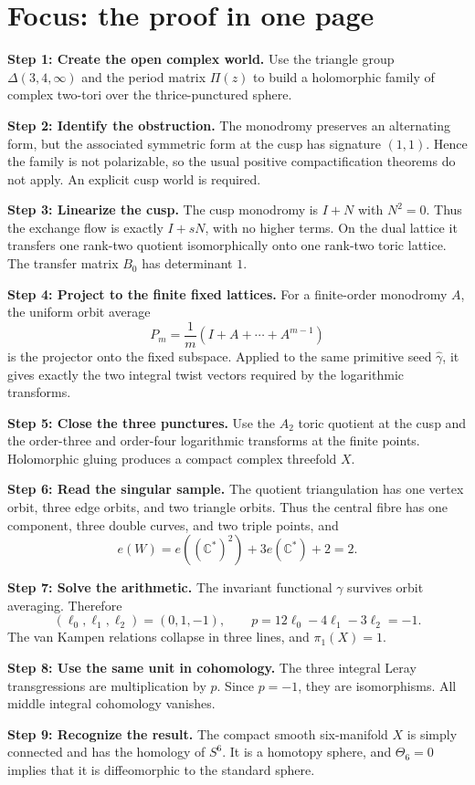\documentclass[11pt,reqno]{amsart}
\numberwithin{equation}{section}
\newcommand{\C}{\mathbb C}
\newcommand{\wideg}{\widehat\gamma}
\theoremstyle{definition}
\newenvironment{proofbox}{%
  \begin{center}\begin{minipage}{0.94\textwidth}\setlength{\parindent}{0pt}\small%
}{%
  \end{minipage}\end{center}%
}
\begin{document}
\section{Focus: the proof in one page}\label{sec:focus}

\begin{proofbox}
\textbf{Step 1: Create the open complex world.}
Use the triangle group $\Delta(3,4,\infty)$ and the period matrix $\Pi(z)$ to build a holomorphic family of complex two-tori over the thrice-punctured sphere.

\medskip
\textbf{Step 2: Identify the obstruction.}
The monodromy preserves an alternating form, but the associated symmetric form at the cusp has signature $(1,1)$. Hence the family is not polarizable, so the usual positive compactification theorems do not apply. An explicit cusp world is required.

\medskip
\textbf{Step 3: Linearize the cusp.}
The cusp monodromy is $I+N$ with $N^2=0$. Thus the exchange flow is exactly $I+sN$, with no higher terms. On the dual lattice it transfers one rank-two quotient isomorphically onto one rank-two toric lattice. The transfer matrix $B_0$ has determinant $1$.

\medskip
\textbf{Step 4: Project to the finite fixed lattices.}
For a finite-order monodromy $A$, the uniform orbit average
\[
P_m=\frac1m(I+A+\cdots+A^{m-1})
\]
is the projector onto the fixed subspace. Applied to the same primitive seed $\wideg$, it gives exactly the two integral twist vectors required by the logarithmic transforms.

\medskip
\textbf{Step 5: Close the three punctures.}
Use the $A_2$ toric quotient at the cusp and the order-three and order-four logarithmic transforms at the finite points. Holomorphic gluing produces a compact complex threefold $X$.

\medskip
\textbf{Step 6: Read the singular sample.}
The quotient triangulation has one vertex orbit, three edge orbits, and two triangle orbits. Thus the central fibre has one component, three double curves, and two triple points, and
\[
e(W)=e((\C^*)^2)+3e(\C^*)+2=2.
\]

\medskip
\textbf{Step 7: Solve the arithmetic.}
The invariant functional $\gamma$ survives orbit averaging. Therefore
\[
(\ell_0,\ell_1,\ell_2)=(0,1,-1),
\qquad p=12\ell_0-4\ell_1-3\ell_2=-1.
\]
The van Kampen relations collapse in three lines, and $\pi_1(X)=1$.

\medskip
\textbf{Step 8: Use the same unit in cohomology.}
The three integral Leray transgressions are multiplication by $p$. Since $p=-1$, they are isomorphisms. All middle integral cohomology vanishes.

\medskip
\textbf{Step 9: Recognize the result.}
The compact smooth six-manifold $X$ is simply connected and has the homology of $S^6$. It is a homotopy sphere, and $\Theta_6=0$ implies that it is diffeomorphic to the standard sphere.
\end{proofbox}
\end{document}
